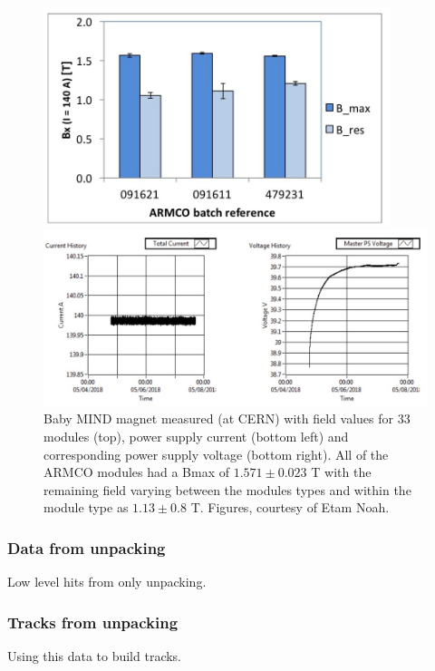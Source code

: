 \begin{figure}[h!]
\centering
\includegraphics[width=0.9\textwidth]{figures/magnetFigure1.jpeg}

\includegraphics[width=\textwidth]{figures/magnetFigure2.jpeg}
\caption{Baby MIND magnet measured (at CERN) with field values for 33 modules (top), power supply current (bottom left) and corresponding power supply voltage (bottom right). All of the ARMCO modules had a Bmax of $1.571 \pm 0.023$ T with the remaining field varying between the modules types and within the module type as $1.13 \pm  0.8 $ T. Figures, courtesy of Etam Noah.}
\label{fig:Magnetplot1}
\end{figure}



\subsubsection{Data from unpacking}
Low level hits from only unpacking.

\subsubsection{Tracks from unpacking}
Using this data to build tracks.
\fi

